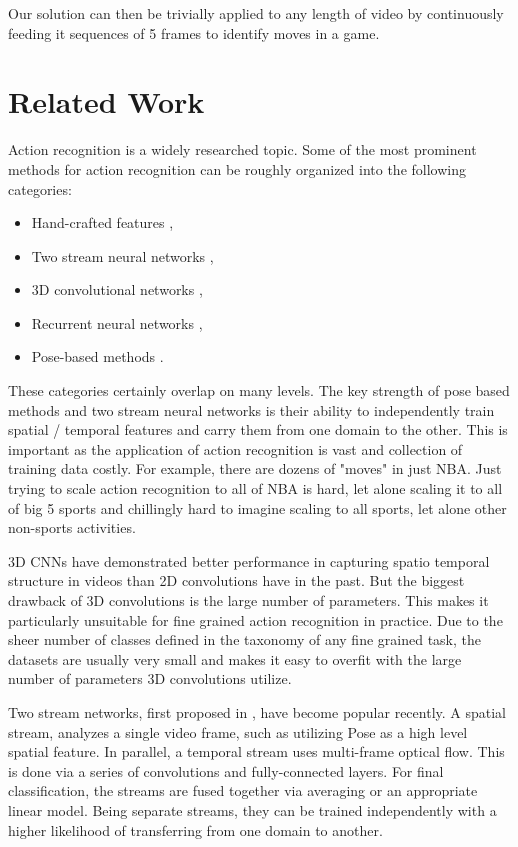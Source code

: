 \documentclass{article}
\begin{document}
Our solution can then be trivially applied to any length of video by continuously feeding it sequences of 5  frames to identify moves in a game.

\section{Related Work}
\label{related_work}
Action recognition is a widely researched topic. Some of the most prominent methods for action recognition can be roughly organized into the following categories: 
\begin{itemize}
\item Hand-crafted features \cite{HengWang:2011:ARD:2191740.2192078,Jain_2013_CVPR,Sun_2018_CVPR},
\item Two stream neural networks \cite{NIPS2014_5353,Feichtenhofer_2016_CVPR, Carreira_2017_CVPR,Zhu_Y,Cai_2019_CVPR_Workshops},
\item 3D convolutional networks \cite{6165309,Tran_2018_CVPR},
\item Recurrent neural networks \cite{Baccouche:2010:ACS:1889001.1889024,Donahue_2015_CVPR},
\item Pose-based methods \cite{Yao_2011,Luvizon_2018_CVPR}.
\end{itemize}

These categories certainly overlap on many levels. The key strength of pose based methods and two stream neural networks is their ability to independently train spatial / temporal features and carry them from one domain to the other. This is important as the application of action recognition is vast and collection of training data costly. For example, there are dozens of "moves" in just NBA. Just trying to scale action recognition to all of NBA is hard, let alone scaling it to all of big 5 sports and chillingly hard to imagine scaling to all sports, let alone other non-sports activities. 

3D CNNs have demonstrated better performance in capturing spatio temporal structure in videos than 2D convolutions have in the past. But the biggest drawback of 3D convolutions is the large number of parameters. This makes it particularly unsuitable for fine grained action recognition in practice. Due to the sheer number of classes defined in the taxonomy of any fine grained task, the datasets are usually very small and makes it easy to overfit with the large number of parameters 3D convolutions utilize.

Two stream networks, first proposed in \cite{NIPS2014_5353}, have become popular recently. A spatial stream, analyzes a single video frame, such as utilizing Pose as a high level spatial feature. In parallel, a temporal stream uses multi-frame optical flow. This is done via a series of convolutions and fully-connected layers. For final classification, the streams are fused together via averaging or an appropriate linear model. Being separate streams, they can be trained independently with a higher likelihood of transferring from one domain to another.
\end{document}

